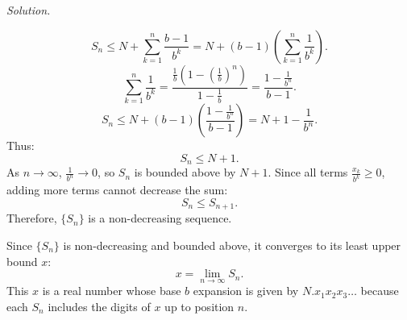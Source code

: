 \documentclass[12pt]{article}
\renewcommand{\_}[1]{\underline{ #1 }}
\theoremstyle{definition}
\newenvironment{exercise}[1]
  {\renewcommand\theinnercustomthm{#1}\innercustomthm}
  {\endinnercustomthm}
\newenvironment{solution}{\par\noindent\textit{Solution.}\ }{\par}
\numberwithin{equation}{subsection}
\begin{document}
\begin{exercise}{18}
\begin{itemize}
\begin{solution}
\begin{itemize}
\[
S_n \leq N + \sum_{k=1}^n \frac{b - 1}{b^k} = N + (b - 1) \left( \sum_{k=1}^n \frac{1}{b^k} \right).
\]
\[
\sum_{k=1}^n \frac{1}{b^k} = \frac{\frac{1}{b} \left(1 - \left( \frac{1}{b} \right)^{n} \right)}{1 - \frac{1}{b}} = \frac{1 - \frac{1}{b^{n}}}{b - 1}.
\]
\[
S_n \leq N + (b - 1) \left( \frac{1 - \frac{1}{b^{n}}}{b - 1} \right) = N + 1 - \frac{1}{b^{n}}.
\]
Thus:
\[
S_n \leq N + 1.
\]
As \( n \to \infty \), \( \frac{1}{b^{n}} \to 0 \), so \( S_n \) is bounded above by \( N + 1 \).
Since all terms \( \frac{x_k}{b^k} \geq 0 \), adding more terms cannot decrease the sum:
\[
S_n \leq S_{n+1}.
\]
Therefore, \( \{ S_n \} \) is a non-decreasing sequence.

Since \( \{ S_n \} \) is non-decreasing and bounded above, it converges to its least upper bound \( x \):
\[
x = \lim_{n \to \infty} S_n.
\]
This \( x \) is a real number whose base \( b \) expansion is given by \( N.x_1x_2x_3\ldots \) because each \( S_n \) includes the digits of \( x \) up to position \( n \).

        \end{itemize}
        \end{solution}
    \end{itemize}
\end{exercise}
\end{document}

